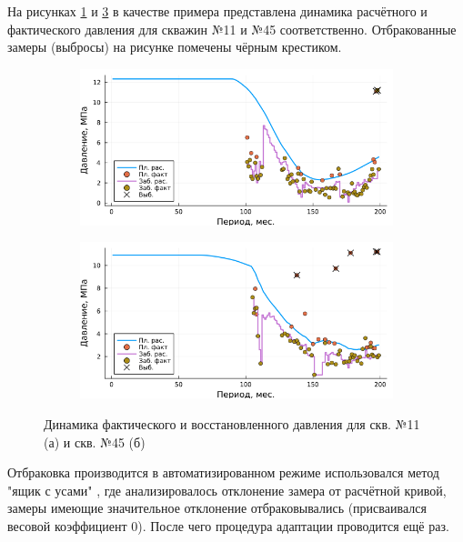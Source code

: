 \documentclass[14pt]{article}
\begin{document}
На рисунках \ref{fig:din_gar_press_11} и \ref{fig:din_gar_press_45} в качестве примера представлена динамика расчётного и фактического давления для скважин №11 и №45 соответственно. Отбракованные замеры (выбросы) на рисунке помечены чёрным крестиком. 
 \begin{figure}[!htb]
	\centering
	\begin{subfigure}[b]{0.9\linewidth}
	\includegraphics[width=1.0\linewidth]{pic/din_gar_press_11}
	\caption{}
	\label{fig:din_gar_press_11}
	\end{subfigure}
	\begin{subfigure}[b]{0.9\linewidth}
		\includegraphics[width=\linewidth]{pic/din_gar_press_45}
		\caption{}
		\label{fig:din_gar_press_45}
	\end{subfigure}
		\caption{Динамика фактического и восстановленного давления для скв. №11 (а) и скв. №45 (б)}
\end{figure}
Отбраковка производится в автоматизированном режиме использовался метод "ящик с усами" \cite{BoxPlot}, где анализировалось отклонение замера от расчётной кривой, замеры имеющие значительное отклонение отбраковывались (присваивался весовой коэффициент 0). После чего процедура адаптации проводится ещё раз. 
\end{document}
